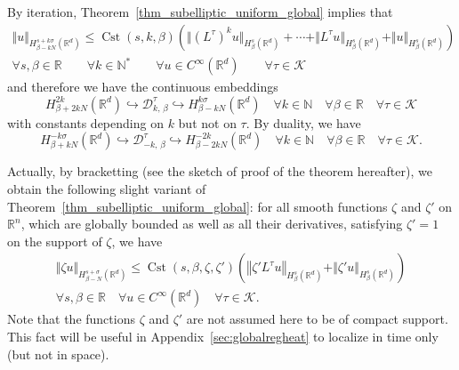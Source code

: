 \documentclass[AHL,Unicode,published]{cedram}
\newcommand*\R{\mathbb{R}}
\newcommand*\N{\mathbb{N}}
\newcommand{\calK}{\mathcal{K}}
\newcommand{\calD}{\mathcal{D}}
\DeclareMathOperator{\Cst}{Cst}
\renewcommand{\leq}{\leqslant}
\let\oldforall\forall
\renewcommand*{\forall}{\mathrel{\oldforall}}
\begin{document}
By iteration, Theorem~\ref{thm_subelliptic_uniform_global} implies that
\begin{multline*}
\Vert u\Vert_{H^{s+k\sigma}_{\beta-kN}\left(\R^d\right)} \leq \Cst(s,k,\beta) \left(\Vert (L^\tau)^k u\Vert_{H^s_\beta\left(\R^d\right)} + \cdots + \Vert L^\tau u\Vert_{H^s_\beta\left(\R^d\right)} + \Vert u\Vert_{H^s_\beta\left(\R^d\right)} \right) \\
\forall s,\beta\in\R\qquad \forall k\in\N^* \qquad \forall u\in C^\infty\left(\R^d\right) \qquad \forall\tau\in\calK
\end{multline*}
and therefore we have the continuous embeddings
\begin{equation}\label{inclusions_global}
H^{2k}_{\beta+2kN}\left(\R^d\right) \hookrightarrow \calD^\tau_{k,\,\beta} \hookrightarrow H^{k\sigma}_{\beta-kN}\left(\R^d\right)
\quad\forall k\in\N\quad\forall\beta\in\R\quad \forall\tau\in\calK
\end{equation}
with constants depending on $k$ but not on $\tau$. By duality, we have
\begin{equation}\label{inclusions_global_neg}
H^{-k\sigma}_{\beta+kN}\left(\R^d\right) \hookrightarrow \calD^\tau_{-k,\,\beta} \hookrightarrow H^{-2k}_{\beta-2kN}\left(\R^d\right) \quad\forall k\in\N\quad\forall\beta\in\R\quad \forall\tau\in\calK.
\end{equation}


\begin{rema}\label{rem_variant_thm_subelliptic_uniform_global}
Actually, by bracketting (see the sketch of proof of the theorem hereafter), we obtain the following slight variant of Theorem~\ref{thm_subelliptic_uniform_global}: for all smooth functions $\zeta$ and $\zeta'$ on $\R^n$, which are globally bounded as well as all their derivatives, satisfying $\zeta'=1$ on the support of $\zeta$, we have
\begin{multline*}
\Vert \zeta u\Vert_{H^{s+\sigma}_{\beta-N}\left(\R^d\right)} \leq \Cst(s,\beta,\zeta,\zeta') \left(\left\Vert \zeta' L^\tau u\right\Vert_{H^s_\beta\left(\R^d\right)} + \Vert \zeta' u\Vert_{H^s_\beta\left(\R^d\right)} \right) \\
\forall s,\beta\in\R \quad \forall u\in C^\infty\left(\R^d\right) \quad \forall\tau\in\calK.
\end{multline*}
Note that the functions $\zeta$ and $\zeta'$ are not assumed here to be of compact support. This fact will be useful in Appendix~\ref{sec:globalregheat} to localize in time only (but not in space).
\end{rema}
\end{document}
